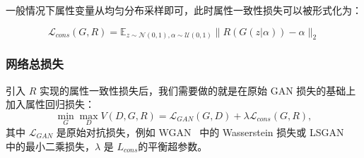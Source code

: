 

一般情况下属性变量从均匀分布采样即可，此时属性一致性损失可以被形式化为：

\begin{equation}
     \mathcal{L}_{cons}(G, R)  =  \mathbb{E}_{z \sim \mathcal{N}(0,1), \alpha \sim \mathcal{U}(0,1)}\|R(G(z|\alpha)) - \alpha\|_2
\end{equation}

\subsubsection{网络总损失}
引入 $R$ 实现的属性一致性损失后，我们需要做的就是在原始 GAN 损失的基础上加入属性回归损失：
\begin{equation}
     \min _{G} \max _{D} V(D, G, R) = \mathcal{L}_{GAN}(G, D) + \lambda \mathcal{L}_{cons}(G, R),
     \label{overall}
\end{equation}
其中 $\mathcal{L}_{GAN}$ 是原始对抗损失，例如 WGAN~\cite{wgan} 中的 Wasserstein 损失或 LSGAN~\cite{lsgan} 中的最小二乘损失，$\lambda$ 是 $L_{cons}$的平衡超参数。

